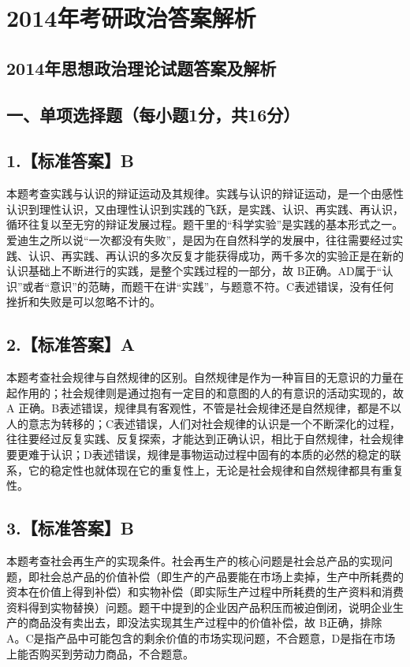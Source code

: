 \documentclass[UTF8,11pt]{ctexart}
\begin{document}
\section*{2014年考研政治答案解析}
\subsection*{2014年思想政治理论试题答案及解析}

\subsection*{一、单项选择题（每小题1分，共16分）}

\subsection*{1.【标准答案】B}

本题考查实践与认识的辩证运动及其规律。实践与认识的辩证运动，是一个由感性认识到理性认识，又由理性认识到实践的飞跃，是实践、认识、再实践、再认识，循环往复以至无穷的辩证发展过程。题干里的“科学实验”是实践的基本形式之一。爱迪生之所以说“一次都没有失败”，是因为在自然科学的发展中，往往需要经过实践、认识、再实践、再认识的多次反复才能获得成功，两千多次的实验正是在新的认识基础上不断进行的实践，是整个实践过程的一部分，故 B正确。AD属于“认识”或者“意识”的范畴，而题干在讲“实践”，与题意不符。C表述错误，没有任何挫折和失败是可以忽略不计的。


\subsection*{2.【标准答案】A}

本题考查社会规律与自然规律的区别。自然规律是作为一种盲目的无意识的力量在起作用的；社会规律则是通过抱有一定目的和意图的人的有意识的活动实现的，故 A 正确。B表述错误，规律具有客观性，不管是社会规律还是自然规律，都是不以人的意志为转移的；C表述错误，人们对社会规律的认识是一个不断深化的过程，往往要经过反复实践、反复探索，才能达到正确认识，相比于自然规律，社会规律要更难于认识；D表述错误，规律是事物运动过程中固有的本质的必然的稳定的联系，它的稳定性也就体现在它的重复性上，无论是社会规律和自然规律都具有重复性。


\subsection*{3.【标准答案】B}

本题考查社会再生产的实现条件。社会再生产的核心问题是社会总产品的实现问题，即社会总产品的价值补偿（即生产的产品要能在市场上卖掉，生产中所耗费的资本在价值上得到补偿）和实物补偿（即实际生产过程中所耗费的生产资料和消费资料得到实物替换）问题。题干中提到的企业因产品积压而被迫倒闭，说明企业生产的商品没有卖出去，即没法实现其生产过程中的价值补偿，故 B正确，排除 A。C是指产品中可能包含的剩余价值的市场实现问题，不合题意，D是指在市场上能否购买到劳动力商品，不合题意。
\end{document}

